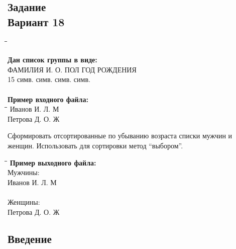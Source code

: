 \documentclass[a4paper, 12pt] {article}
\begin{document}
\newpage

\begin{center}
  \section*{Задание\\ {\large Вариант 18}}
\end{center}

\begin{tabbing}
  \hspace{8em}\= \hspace{4em}\= \hspace{4em}\= \kill

  \textbf{Дан список группы в виде:}\\
  ФАМИЛИЯ     \> И. О.       \> ПОЛ         \> ГОД РОЖДЕНИЯ\\  
  15 симв.     симв.      симв.      симв.\\
  \\
  \textbf{Пример входного файла:}\\
  \hspace{8em}\= \hspace{3.5em}\= \hspace{2em}\= \kill
  Иванов      \> И. Л.         \> М           \\
  Петрова     \> Д. О.         \> Ж           \\
\end{tabbing}
Сформировать отсортированные по убыванию возраста списки мужчин и
женщин. Использовать для сортировки метод “выбором”.\\
\begin{tabbing}
  \hspace{8em}\= \hspace{3.5em}\= \hspace{2em}\= \kill
  \textbf{Пример выходного файла:}\\
  Мужчины:\\
  Иванов         \> И. Л.      \> М           \\
  \\
  Женщины:\\
  Петрова        \> Д. О.      \> Ж           \\
\end{tabbing}

\begin{center}
  \section*{Введение}
\end{center}
\end{document}
